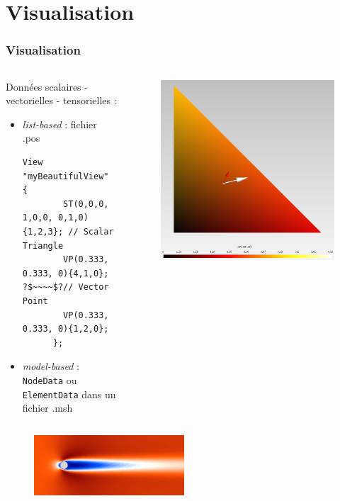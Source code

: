 \documentclass[aspectratio=169]{beamer}
\begin{document}
\section{Visualisation}
\begin{frame}[fragile]
\frametitle{Visualisation}
\begin{columns}
  \begin{column}{0.8\linewidth}
    \hspace{0.5cm}
    Données scalaires - vectorielles - tensorielles :
    \begin{itemize}
      \item \textit{list-based} : fichier .pos
      \begin{lstlisting}[frame=none, aboveskip=0mm, belowskip=0mm, escapechar=?]
      View "myBeautifulView" {
        ST(0,0,0, 1,0,0, 0,1,0){1,2,3}; // Scalar Triangle
        VP(0.333, 0.333, 0){4,1,0}; ?$~~~~$?// Vector Point
        VP(0.333, 0.333, 0){1,2,0};
      };
      \end{lstlisting}
      \item \textit{model-based} : \texttt{NodeData} ou \texttt{ElementData} dans un fichier .msh
    \end{itemize}
  \end{column}
  \begin{column}{0.5\linewidth}
    \begin{figure}
      \hspace{-3cm}
      \includegraphics[width=0.5\linewidth]{figures/visu.png}
      \caption{}
      \label{}
    \end{figure}
  \end{column}
\end{columns}
\begin{figure}
  \vspace{-0.7cm}
  \includegraphics[width=0.5\textwidth]{figures/solU_flow.png}

\end{figure}
\end{frame}
\end{document}
